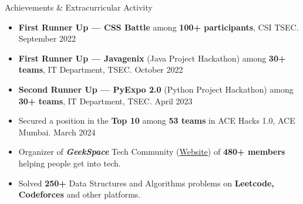 \documentclass{resume} %
\begin{document}
\begin{rSection}{Achievements \& Extracurricular Activity}
    \begin{itemize}
        \setlength\itemsep{-0.6em}
        \item \textbf{First Runner Up — CSS Battle} among \textbf{100+ participants}, CSI TSEC. \hfill {September 2022}
        \item \textbf{First Runner Up — Javagenix} (Java Project Hackathon) among \textbf{30+ teams}, IT Department, TSEC. \hfill {October 2022}
        \item \textbf{Second Runner Up — PyExpo 2.0} (Python Project Hackathon) among \textbf{30+ teams}, IT Department, TSEC. \hfill {April 2023}
        \item Secured a position in the \textbf{Top 10} among \textbf{53 teams} in ACE Hacks
              1.0, ACE Mumbai. \hfill{March 2024}
        \item Organizer of \textbf{\textit{GeekSpace}} Tech Community
              (\href{https://geekspaceclub.xyz}{Website}) of \textbf{480+ members} helping
              people get into tech.
        \item Solved \textbf{250+} Data Structures and Algorithms problems on
              \textbf{Leetcode, Codeforces} and other platforms.
    \end{itemize}

\end{rSection}

\end{document}
